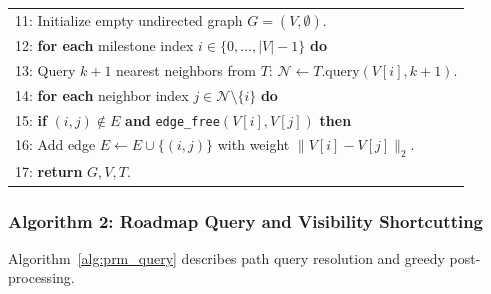 \documentclass[12pt,a4paper]{article}
\begin{document}
\begin{table}[H]
{\begin{tabular}{|p{\dimexpr\linewidth-2\tabcolsep-2\arrayrulewidth\relax}|}
11: Initialize empty undirected graph $G = (V, \emptyset)$. \\
12: \textbf{for each} milestone index $i \in \{0, \dots, |V| - 1\}$ \textbf{do} \\
13: \quad Query $k+1$ nearest neighbors from $T$: $\mathcal{N} \leftarrow T.\text{query}(V[i], k+1)$. \\
14: \quad \textbf{for each} neighbor index $j \in \mathcal{N} \setminus \{i\}$ \textbf{do} \\
15: \qquad \textbf{if} $(i, j) \notin E$ \textbf{and} \texttt{edge\_free}$(V[i], V[j])$ \textbf{then} \\
16: \qquad \quad Add edge $E \leftarrow E \cup \{(i, j)\}$ with weight $\|V[i] - V[j]\|_2$. \\
17: \textbf{return} $G, V, T$. \\ \hline
\end{tabular}
}
\end{table}

\clearpage
\subsubsection{Algorithm 2: Roadmap Query and Visibility Shortcutting}
Algorithm~\ref{alg:prm_query} describes path query resolution and greedy post-processing.
\end{document}
